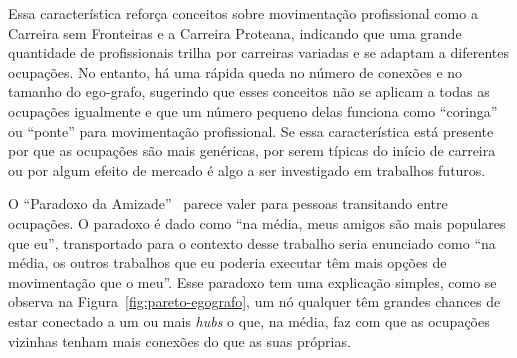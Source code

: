 \documentclass[
  article,
  11pt,
  a4paper,
  english,
  brazil,
  sumario=tradicional]{abntex2}
\begin{document}
Essa característica reforça conceitos sobre movimentação profissional como a Carreira sem Fronteiras e a Carreira Proteana, indicando que uma grande quantidade de profissionais trilha por carreiras variadas e se adaptam a diferentes ocupações. No entanto, há uma rápida queda no número de conexões e no tamanho do ego-grafo, sugerindo que esses conceitos não se aplicam a todas as ocupações igualmente e que um número pequeno delas funciona como \enquote{coringa} ou \enquote{ponte} para movimentação profissional. Se essa característica está presente por que as ocupações são mais genéricas, por serem típicas do início de carreira ou por algum efeito de mercado é algo a ser investigado em trabalhos futuros.


O \enquote{Paradoxo da Amizade}~\cite{Barabasi2016-rn} parece valer para pessoas transitando entre ocupações. O paradoxo é dado como \enquote{na média, meus amigos são mais populares que eu}, transportado para o contexto desse trabalho seria enunciado como \enquote{na média, os outros trabalhos que eu poderia executar têm mais opções de movimentação que o meu}. Esse paradoxo tem uma explicação simples, como se observa na Figura~\ref{fig:pareto-egografo}, um nó qualquer têm grandes chances de estar conectado a um ou mais \textit{hubs} o que, na média, faz com que as ocupações vizinhas tenham mais conexões do que as suas próprias.

\end{document}
